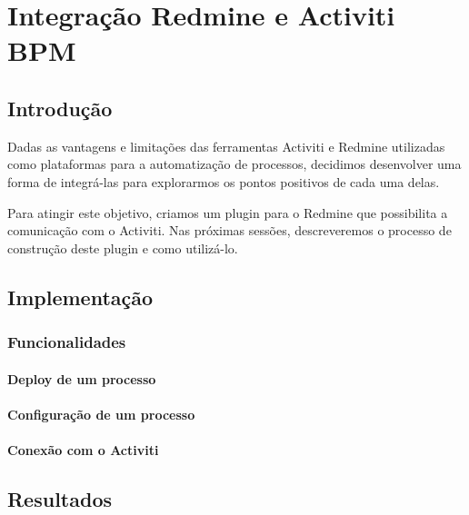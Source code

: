 \chapter{Integração Redmine e Activiti BPM}\label{chp:integracao_redmine_activiti}

\section{Introdução}\label{sec:integracao_redmine_activiti-introducao}
Dadas as vantagens e limitações das ferramentas Activiti e Redmine utilizadas como plataformas para a automatização de processos, decidimos desenvolver uma forma de integrá-las para explorarmos os pontos positivos de cada uma delas.

Para atingir este objetivo, criamos um plugin para o Redmine que possibilita a comunicação com o Activiti. Nas próximas sessões, descreveremos o processo de construção deste plugin e como utilizá-lo.


\section{Implementação}\label{sec:integracao_redmine_activiti-implementacao}

\subsection{Funcionalidades}\label{sec:integracao_redmine_activiti_implementacao_funcionalidades}

\subsubsection{Deploy de um processo}\label{sec:integracao_redmine_activiti_inplementacao_funcionalidades_deploy}

\subsubsection{Configuração de um processo}\label{sec:integracao_redmine_activiti_inplementacao_funcionalidades_deploy}

\subsubsection{Conexão com o Activiti }\label{sec:integracao_redmine_activiti_inplementacao_funcionalidades_conexão}


\section{Resultados}\label{sec:integracao_redmine_activiti-resultados}